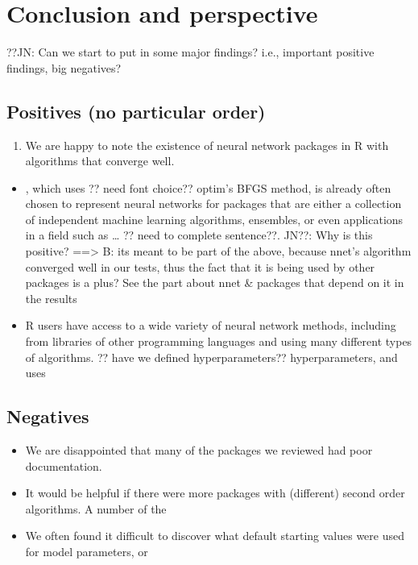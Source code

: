 \hypertarget{conclusion-and-perspective}{%
\section{Conclusion and perspective}\label{conclusion-and-perspective}}

??JN: Can we start to put in some major findings? i.e., important
positive findings, big negatives?

\hypertarget{positives-no-particular-order}{%
\subsection{Positives (no particular
order)}\label{positives-no-particular-order}}

\begin{enumerate}
\def\labelenumi{\arabic{enumi}.}
\tightlist
\item
  We are happy to note the existence of neural network packages in R
  with algorithms that converge well.
\end{enumerate}

\begin{itemize}
\tightlist
\item
  , which uses ?? need font choice?? optim's BFGS method, is
  already often chosen to represent neural networks for packages that
  are either a collection of independent machine learning algorithms,
  ensembles, or even applications in a field such as \ldots{} ?? need to
  complete sentence??. JN??: Why is this positive? ==\textgreater{} B:
  its meant to be part of the above, because nnet's algorithm converged
  well in our tests, thus the fact that it is being used by other
  packages is a plus? See the part about nnet \& packages that depend on
  it in the results
\item
  R users have access to a wide variety of neural network methods,
  including from libraries of other programming languages and using many
  different types of algorithms. ?? have we defined hyperparameters??
  hyperparameters, and uses
\end{itemize}

\hypertarget{negatives}{%
\subsection{Negatives}\label{negatives}}

\begin{itemize}
\tightlist
\item
  We are disappointed that many of the packages we reviewed had poor
  documentation.
\item
  It would be helpful if there were more packages with (different)
  second order algorithms. A number of the
\item
  We often found it difficult to discover what default starting values
  were used for model parameters, or
\end{itemize}

